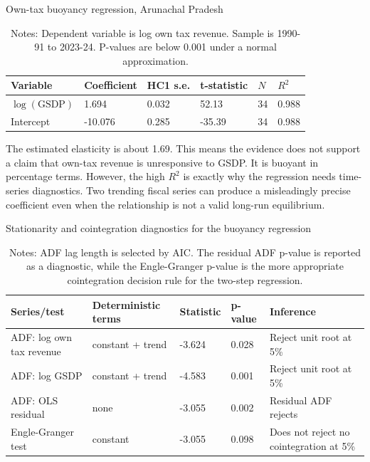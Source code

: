 \documentclass[11pt,a4paper]{article}
\begin{document}
\begin{table}[H]
\centering
\caption{Own-tax buoyancy regression, Arunachal Pradesh}
\small
\begin{tabular}{L{3.0cm}C{2.0cm}C{1.8cm}C{1.8cm}C{1.6cm}C{1.6cm}}
\toprule
Variable & Coefficient & HC1 s.e. & t-statistic & $N$ & $R^2$ \\
\midrule
$\log(\text{GSDP})$ & 1.694 & 0.032 & 52.13 & 34 & 0.988 \\
Intercept & -10.076 & 0.285 & -35.39 & 34 & 0.988 \\
\bottomrule
\end{tabular}
\caption*{\footnotesize Notes: Dependent variable is log own tax revenue. Sample is 1990-91 to 2023-24. P-values are below 0.001 under a normal approximation.}
\end{table}

The estimated elasticity is about 1.69. This means the evidence does not support a claim that own-tax revenue is unresponsive to GSDP. It is buoyant in percentage terms. However, the high $R^2$ is exactly why the regression needs time-series diagnostics. Two trending fiscal series can produce a misleadingly precise coefficient even when the relationship is not a valid long-run equilibrium.

\begin{table}[H]
\centering
\caption{Stationarity and cointegration diagnostics for the buoyancy regression}
\small
\begin{tabular}{L{4.1cm}C{2.1cm}C{1.7cm}C{1.7cm}L{3.4cm}}
\toprule
Series/test & Deterministic terms & Statistic & p-value & Inference \\
\midrule
ADF: log own tax revenue & constant + trend & -3.624 & 0.028 & Reject unit root at 5\% \\
ADF: log GSDP & constant + trend & -4.583 & 0.001 & Reject unit root at 5\% \\
ADF: OLS residual & none & -3.055 & 0.002 & Residual ADF rejects \\
Engle-Granger test & constant & -3.055 & 0.098 & Does not reject no cointegration at 5\% \\
\bottomrule
\end{tabular}
\caption*{\footnotesize Notes: ADF lag length is selected by AIC. The residual ADF p-value is reported as a diagnostic, while the Engle-Granger p-value is the more appropriate cointegration decision rule for the two-step regression.}
\end{table}
\end{document}
